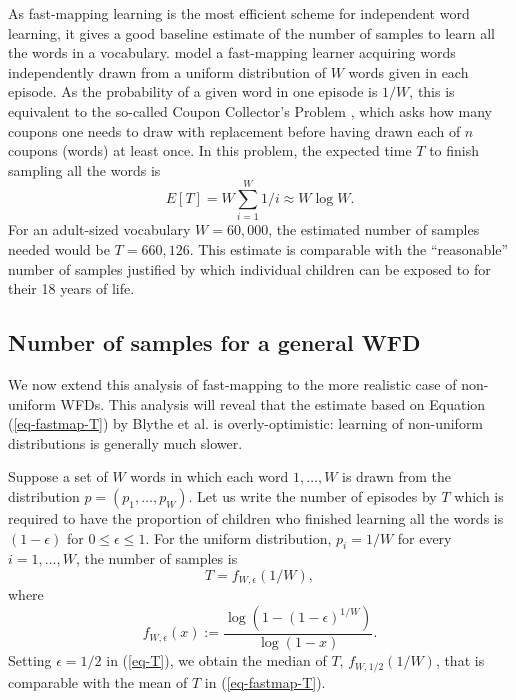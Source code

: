 \documentclass[a4paper,natbib,man]{apa6}
\def\citeA{\citep}
\begin{document}
As fast-mapping learning is the most efficient scheme for independent word learning, it gives a good baseline estimate of the number of samples to learn all the words in a vocabulary.
\cite{Blythe:2010} model a fast-mapping learner acquiring words independently drawn from a uniform distribution of $W$ words given in each episode.
As the probability of a given word in one episode is $1/W$, this is equivalent to the so-called Coupon Collector's Problem \citep{Blom1994}, which asks how many coupons one needs to draw with replacement before having drawn each of $n$ coupons (words) at least once. 
In this problem, the expected time $T$ to finish sampling all the words is 
\begin{equation}
\label{eq-fastmap-T}
 E[T] = W \sum_{i=1}^{W} 1/i \approx W \log W. 
\end{equation}
For an adult-sized vocabulary $W = 60,000$, the estimated number of samples needed would be $T = 660,126$. %
This estimate is comparable with the ``reasonable'' number of samples justified by \citeA{Blythe:2010} which individual children can be exposed to for their 18 years of life.

\subsection{Number of samples for a general WFD}
We now extend this analysis of fast-mapping to the more realistic case of non-uniform WFDs.
This analysis will reveal that the estimate based on Equation (\ref{eq-fastmap-T}) by Blythe et al. is overly-optimistic: learning of non-uniform distributions is generally much slower.

Suppose a set of $W$ words in which each word $1, \ldots, W$ is drawn from the distribution $p = (p_{1}, \ldots, p_{W})$.
Let us write the number of episodes by $T$ which is required to have
the proportion of children who finished learning all the words is $(1 - \epsilon)$ for $0 \le \epsilon \le 1$.
For the uniform distribution, $p_{i} = 1/W$ for every $i = 1, \ldots, W$, the number of samples is 
\begin{equation}
\label{eq-T}
 T = f_{W, \epsilon}( 1/W ),
\end{equation}
where
\[
 f_{W, \epsilon}( x ) := 
\frac{ 
  \log\left( 1 - ( 1 - \epsilon )^{1/W} \right) 
}{ 
  \log\left( 1 - x \right) 
}.
\]
Setting $\epsilon = 1/2$ in (\ref{eq-T}), we obtain the median of $T$, $f_{W,1/2}(1/W)$, that is comparable with the mean of $T$ in (\ref{eq-fastmap-T}).
\end{document}
